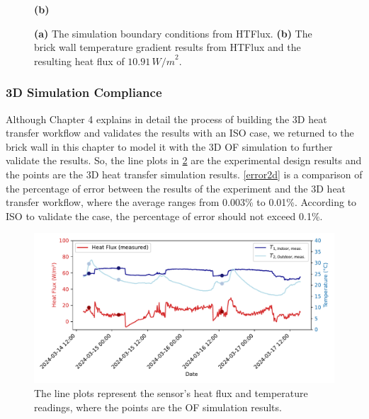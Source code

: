 \begin{figure}[H]
\begin{minipage}{0.49\textwidth}
  \textbf{(b)}
\end{minipage}
\caption[2D HTFlux Boundary conditions]{\textbf{(a)} The simulation boundary conditions from HTFlux. \textbf{(b)} The brick wall temperature gradient results from HTFlux and the resulting heat flux of \( 10.91 \, {W/m}^2 \). }
\label{2dconst}
\end{figure}


\subsubsection{3D Simulation Compliance}\label{3dbrick}
Although Chapter 4 explains in detail the process of building the 3D heat transfer workflow and validates the results with an ISO case, we returned to the brick wall in this chapter to model it with the 3D \gls{OF} simulation to further validate the results. So, the line plots in \ref{fig:expr} are the experimental design results and the points are the 3D heat transfer simulation results. \ref{error2d} is a comparison of the percentage of error between the results of the experiment and the 3D heat transfer workflow, where the average ranges from 0.003\% to 0.01\%.
According to ISO \cite{ISO} to validate the case, the percentage of error should not exceed 0.1\%.

\begin{figure}[tb]
     \centering
    \includegraphics[width=1\linewidth, trim= 0.2cm 0.2cm 0.2cm 0.2cm, clip=true]{Figures/Validation}
     \caption[2D Experimental Report Plot]{The line plots represent the sensor's heat flux and temperature readings, where the points are the \gls{OF} simulation results.}
   \label{fig:expr}
 \end{figure}





